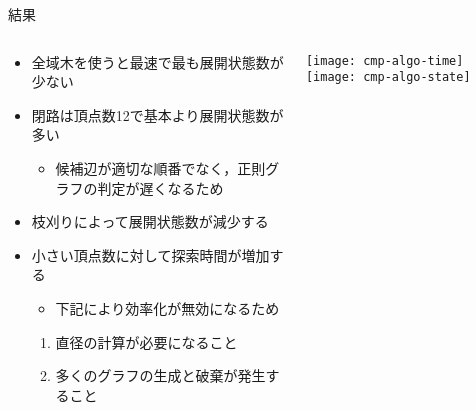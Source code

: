 \begin{frame}{結果}
  \begin{columns}[T]
    \begin{column}{.5\textwidth}
      \begin{itemize}
      \item 全域木を使うと最速で最も展開状態数が少ない
      \item 閉路は頂点数12で基本より展開状態数が多い
        \begin{itemize}
        \item 候補辺が適切な順番でなく，正則グラフの判定が遅くなるため
        \end{itemize}
        \medskip
      \item 枝刈りによって展開状態数が減少する
      \item 小さい頂点数に対して探索時間が増加する
        \begin{itemize}
        \item 下記により効率化が無効になるため
        \end{itemize}
        \vspace*{-.5em}
        \begin{enumerate}
        \item 直径の計算が必要になること
        \item 多くのグラフの生成と破棄が発生すること
        \end{enumerate}
      \end{itemize}
    \end{column}
    \begin{column}{.5\textwidth}
      \centering
      \texttt{[image: cmp-algo-time]}
      \vfill
      \texttt{[image: cmp-algo-state]}
    \end{column}
  \end{columns}
\end{frame}

